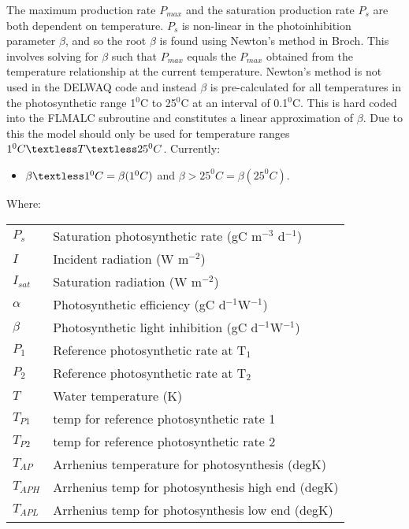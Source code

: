 \documentclass{deltares_manual}
\begin{document}
The maximum production rate $P_{max}$ and the saturation production rate $P_{s}$ are both dependent on temperature. $P_{s}$ is non-linear in the photoinhibition parameter $\beta$, and so the root $\beta$ is found using Newton's method in Broch. This involves solving for $\beta$ such that $P_{max}$ equals the $P_{max}$ obtained from the temperature relationship at the current temperature. Newton's method is not used in the DELWAQ code and instead $\beta$ is pre-calculated for all temperatures in the photosynthetic range 1$^{0}$C to 25$^{0}$C at an interval of 0.1$^{0}$C. This is hard coded into the FLMALC subroutine and constitutes a linear approximation of $\beta$. Due to this the model should only be used for temperature ranges $1^{0}C \textless T \textless 25^{0}C$. Currently:
\begin{itemize}
	\item $\beta \textless 1 ^{0}C = \beta(1 ^{0}C)$ and $\beta > 25 ^{0}C = \beta(25 ^{0}C)$. 
\end{itemize} 


Where:\\
\begin{tabular}{ll}
$P_s$ & Saturation photosynthetic rate (gC m$^{-3}$ d$^{-1}$)\\
$I$ & Incident radiation (W m$^{-2}$)\\
$I_{sat}$ & Saturation radiation (W m$^{-2}$)\\
$\alpha$ & Photosynthetic efficiency (gC d$^{-1}$W$^{-1}$) \\
$\beta$ & Photosynthetic light inhibition (gC d$^{-1}$W$^{-1}$) \\
$P_1$ & Reference photosynthetic rate at T$_1$\\
$P_2$ & Reference photosynthetic rate at T$_2$\\
$T$ & Water temperature (K)\\
$T_{P1}$ & temp for reference photosynthetic rate 1\\
$T_{P2}$ & temp for reference photosynthetic rate 2	\\
$T_{AP}$ & Arrhenius temperature for photosynthesis               (degK)\\
$T_{APH}$ & Arrhenius temp for photosynthesis high end             (degK)\\
$T_{APL}$ & Arrhenius temp for photosynthesis low end             (degK)\\
\end{tabular}
\end{document}
